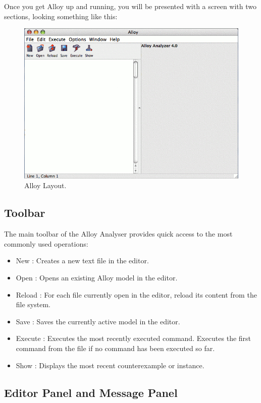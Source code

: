 \documentclass[a4paper,10pt]{report}
\begin{document}
Once you get Alloy up and running, you will be presented with a screen with two sections, looking something like this:

 \begin{figure}[h!]
\centering
 \includegraphics[width= 1\textwidth]{alloyblank.png}
\caption{Alloy Layout.}
 \end{figure}
 
\subsection{Toolbar}
\label{Tools}

The main toolbar of the Alloy Analyser provides quick access to the most commonly used operations:
\begin{itemize}
\item New : Creates a new text file in the editor.
\item Open : Opens an existing Alloy model in the editor.
\item Reload : For each file currently open in the editor, reload its content from the file system.
\item Save : Saves the currently active model in the editor.
\item Execute : Executes the most recently executed command. Executes the first command from the file if no command has been executed so far.
\item Show : Displays the most recent counterexample or instance.
\end{itemize}

\subsection{Editor Panel and Message Panel}
\label{Editor and Message Panel}
\end{document}
